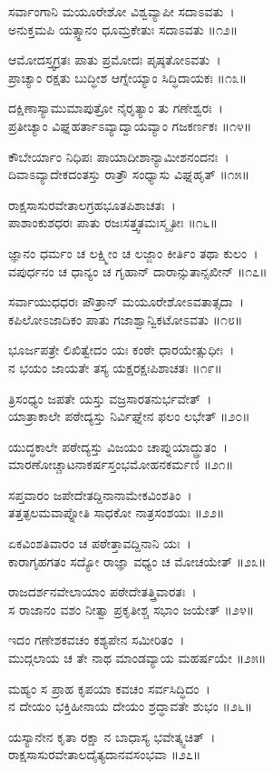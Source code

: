 ಸರ್ವಾಂಗಾನಿ ಮಯೂರೇಶೋ ವಿಶ್ವವ್ಯಾಪೀ ಸದಾಽವತು~।\\
ಅನುಕ್ತಮಪಿ ಯತ್ಸ್ಥಾನಂ ಧೂಮ್ರಕೇತುಃ ಸದಾಽವತು ॥೧೨॥

ಆಮೋದಸ್ತ್ವಗ್ರತಃ ಪಾತು ಪ್ರಮೋದಃ ಪೃಷ್ಠತೋಽವತು~।\\
ಪ್ರಾಚ್ಯಾಂ ರಕ್ಷತು ಬುದ್ಧೀಶ ಆಗ್ನೇಯ್ಯಾಂ ಸಿದ್ಧಿದಾಯಕಃ ॥೧೩॥

ದಕ್ಷಿಣಾಸ್ಯಾಮುಮಾಪುತ್ರೋ ನೈರೃತ್ಯಾಂ ತು ಗಣೇಶ್ವರಃ~।\\
ಪ್ರತೀಚ್ಯಾಂ ವಿಘ್ನಹರ್ತಾಽವ್ಯಾದ್ವಾಯವ್ಯಾಂ ಗಜಕರ್ಣಕಃ ॥೧೪॥

ಕೌಬೇರ್ಯಾಂ ನಿಧಿಪಃ ಪಾಯಾದೀಶಾನ್ಯಾಮೀಶನಂದನಃ~।\\
ದಿವಾಽವ್ಯಾದೇಕದಂತಸ್ತು ರಾತ್ರೌ ಸಂಧ್ಯಾಸು ವಿಘ್ನಹೃತ್ ॥೧೫॥

ರಾಕ್ಷಸಾಸುರವೇತಾಲಗ್ರಹಭೂತಪಿಶಾಚತಃ~।\\
ಪಾಶಾಂಕುಶಧರಃ ಪಾತು ರಜಃಸತ್ತ್ವತಮಃಸ್ಮೃತೀಃ ॥೧೬॥

ಜ್ಞಾನಂ ಧರ್ಮಂ ಚ ಲಕ್ಷ್ಮೀಂ ಚ ಲಜ್ಜಾಂ ಕೀರ್ತಿಂ ತಥಾ ಕುಲಂ~।\\
ವಪುರ್ಧನಂ ಚ ಧಾನ್ಯಂ ಚ ಗೃಹಾನ್ ದಾರಾನ್ಸುತಾನ್ಸಖೀನ್ ॥೧೭॥

ಸರ್ವಾಯುಧಧರಃ ಪೌತ್ರಾನ್ ಮಯೂರೇಶೋಽವತಾತ್ಸದಾ~।\\
ಕಪಿಲೋಽಜಾದಿಕಂ ಪಾತು ಗಜಾಶ್ವಾನ್ವಿಕಟೋಽವತು ॥೧೮॥

ಭೂರ್ಜಪತ್ರೇ ಲಿಖಿತ್ವೇದಂ ಯಃ ಕಂಠೇ ಧಾರಯೇತ್ಸುಧೀಃ~।\\
ನ ಭಯಂ ಜಾಯತೇ ತಸ್ಯ ಯಕ್ಷರಕ್ಷಃಪಿಶಾಚತಃ ॥೧೯॥

ತ್ರಿಸಂಧ್ಯಂ ಜಪತೇ ಯಸ್ತು ವಜ್ರಸಾರತನುರ್ಭವೇತ್~।\\
ಯಾತ್ರಾಕಾಲೇ ಪಠೇದ್ಯಸ್ತು ನಿರ್ವಿಘ್ನೇನ ಫಲಂ ಲಭೇತ್ ॥೨೦॥

ಯುದ್ಧಕಾಲೇ ಪಠೇದ್ಯಸ್ತು ವಿಜಯಂ ಚಾಪ್ನುಯಾದ್ದ್ರುತಂ~।\\
ಮಾರಣೋಚ್ಚಾಟನಾಕರ್ಷಸ್ತಂಭಮೋಹನಕರ್ಮಣಿ ॥೨೧॥

ಸಪ್ತವಾರಂ ಜಪೇದೇತದ್ದಿನಾನಾಮೇಕವಿಂಶತಿಂ~।\\
ತತ್ತತ್ಫಲಮವಾಪ್ನೋತಿ ಸಾಧಕೋ ನಾತ್ರಸಂಶಯಃ ॥೨೨॥

ಏಕವಿಂಶತಿವಾರಂ ಚ ಪಠೇತ್ತಾವದ್ದಿನಾನಿ ಯಃ~।\\
ಕಾರಾಗೃಹಗತಂ ಸದ್ಯೋ ರಾಜ್ಞಾ ವಧ್ಯಂ ಚ ಮೋಚಯೇತ್ ॥೨೩॥

ರಾಜದರ್ಶನವೇಲಾಯಾಂ ಪಠೇದೇತತ್ತ್ರಿವಾರತಃ~।\\
ಸ ರಾಜಾನಂ ವಶಂ ನೀತ್ವಾ ಪ್ರಕೃತೀಶ್ಚ ಸಭಾಂ ಜಯೇತ್ ॥೨೪॥

ಇದಂ ಗಣೇಶಕವಚಂ ಕಶ್ಯಪೇನ ಸಮೀರಿತಂ~।\\
ಮುದ್ಗಲಾಯ ಚ ತೇ ನಾಥ ಮಾಂಡವ್ಯಾಯ ಮಹರ್ಷಯೇ ॥೨೫॥

ಮಹ್ಯಂ ಸ ಪ್ರಾಹ ಕೃಪಯಾ ಕವಚಂ ಸರ್ವಸಿದ್ಧಿದಂ~।\\
ನ ದೇಯಂ ಭಕ್ತಿಹೀನಾಯ ದೇಯಂ ಶ್ರದ್ಧಾವತೇ ಶುಭಂ ॥೨೬॥

ಯಸ್ಯಾನೇನ ಕೃತಾ ರಕ್ಷಾ ನ ಬಾಧಾಸ್ಯ ಭವೇತ್ಕ್ವಚಿತ್~।\\
ರಾಕ್ಷಸಾಸುರವೇತಾಲದೈತ್ಯದಾನವಸಂಭವಾ ॥೨೭॥

